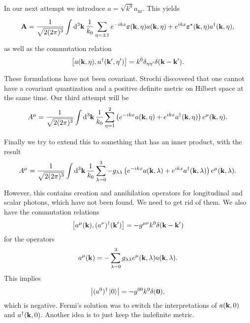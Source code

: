 In our next attempt we introduce $a = \sqrt{k^{0}}a_{\text{nr}}$. This yields
\begin{align*}
	\vb{A} = \frac{1}{\sqrt{2(2\pi)^{3}}}\int\limits_{}^{}\dd[3]{\vb{k}}\frac{1}{k_{0}}\sum\limits_{\eta = \pm 1}e^{-ikx}\vb*{\varepsilon}(\vb{k}, \eta)a(\vb{k}, \eta) + e^{ikx}\vb*{\varepsilon}^{\star}(\vb{k}, \eta)a^{\dagger}(\vb{k}, \eta),
\end{align*}
as well as the commutation relation
\begin{align*}
	\comm{a(\vb{k}, \eta)}{a\adj(\vb{k}\p, \eta\p)} = k^{0}\delta_{\eta\eta\p}\delta(\vb{k} - \vb{k}\p).
\end{align*}

These formulations have not been covariant. Strochi discovered that one cannot have a covariant quantization and a positive definite metric on Hilbert space at the same time. Our third attempt will be
\begin{align*}
	A^{\mu} = \frac{1}{\sqrt{2(2\pi)^{3}}}\int\limits_{}^{}\dd[3]{\vb{k}}\frac{1}{k_{0}}\sum\limits_{\eta = 1}^{2}\left(e^{-ikx}a(\vb{k}, \eta) + e^{ikx}a^{\dagger}(\vb{k}, \eta)\right)e^{\mu}(\vb{k}, \eta).
\end{align*}

Finally we try to extend this to something that has an inner product, with the result
\begin{align*}
	A^{\mu} = \frac{1}{\sqrt{2(2\pi)^{3}}}\int\limits_{}^{}\dd[3]{\vb{k}}\frac{1}{k_{0}}\sum\limits_{\lambda = 0}^{3}-g_{\lambda\lambda}\left(e^{-ikx}a(\vb{k}, \lambda) + e^{ikx}a^{\dagger}(\vb{k}, \lambda)\right)e^{\mu}(\vb{k}, \lambda).
\end{align*}
However, this contains creation and annihilation operators for longitudinal and scalar photons, which have not been found. We need to get rid of them. We also have the commutation relations
\begin{align*}
	\comm{a^{\mu}(\vb{k})}{(a^{\nu})\adj(\vb{k}\p)} = -g^{\mu\nu}k^{0}\delta(\vb{k} - \vb{k}\p)
\end{align*}
for the operators
\begin{align*}
	a^{\mu}(\vb{k}) = -\sum\limits_{\lambda = 0}^{3}g_{\lambda\lambda}e^{\mu}(\vb{k}, \lambda)a(\vb{k}, \lambda).
\end{align*}
This implies
\begin{align*}
	\abs{(a^{0})^{\dagger}\ket{0}} = -g^{00}k^{0}\delta(\vb{0}),
\end{align*}
which is negative. Fermi's solution was to switch the interpretations of $a(\vb{k}, 0)$ and $a^{\dagger}(\vb{k}, 0)$. Another idea is to just keep the indefinite metric.


